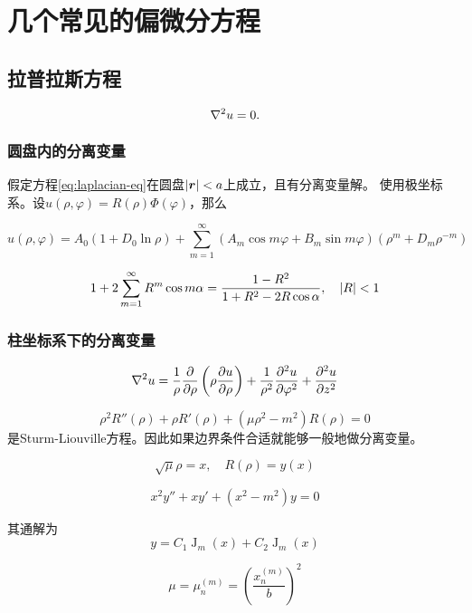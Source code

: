 \documentclass[UTF8]{ctexart}
\DeclareMathOperator{\besselj}{J}
\begin{document}
\section{几个常见的偏微分方程}

\subsection{拉普拉斯方程}

\begin{equation}
    \laplacian u = 0.
    \label{eq:laplacian-eq}
\end{equation}

\subsubsection{圆盘内的分离变量}

假定方程\eqref{eq:laplacian-eq}在圆盘$\abs{\vb*{r}} < a$上成立，且有分离变量解。
使用极坐标系。设$u(\rho, \varphi) = R(\rho) \Phi(\varphi)$，那么

\begin{equation}
    u(\rho, \varphi) = A_0 (1 + D_0 \ln \rho) 
    + \sum_{m=1}^\infty (A_m \cos m \varphi + B_m \sin m \varphi) (\rho^m+D_m \rho^{-m})
\end{equation}

\[
    1 + 2 \sum_{m=1}^\infty R^m \cos m \alpha = \frac{1 - R^2}{1 + R^2 - 2 R \cos \alpha}, \quad \abs{R} < 1
\]

\subsubsection{柱坐标系下的分离变量}

\begin{equation}
    \laplacian u = \frac{1}{\rho} \pdv{\rho} \left( \rho \pdv{u}{\rho} \right) + \frac{1}{\rho^2} \pdv[2]{u}{\varphi} + \pdv[2]{u}{z}
\end{equation}

\[
    \rho^2 R''(\rho) + \rho R'(\rho) + (\mu \rho^2 - m^2) R(\rho) = 0
\]
是Sturm-Liouville方程。因此如果边界条件合适就能够一般地做分离变量。

\[
    \sqrt{\mu} \rho = x, \quad R(\rho) = y(x)
\]

\[
    x^2 y'' + xy' + (x^2 - m^2) y = 0
\]

其通解为
\[
    y = C_1 \besselj_m(x) + C_2 \besselj_m(x)
\]

\[
    \mu = \mu_n^{(m)} = \left( \frac{x^{(m)}_n}{b} \right)^2
\]
\end{document}
